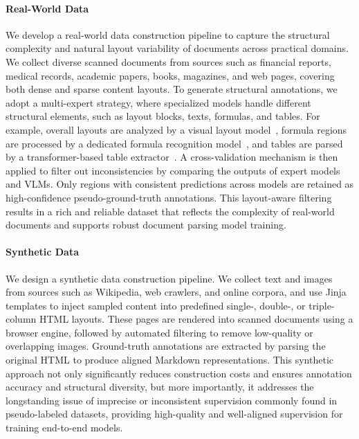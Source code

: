 \paragraph{Real-World Data} We develop a real-world data construction pipeline to capture the structural complexity and natural layout variability of documents across practical domains. We collect diverse scanned documents from sources such as financial reports, medical records, academic papers, books, magazines, and web pages, covering both dense and sparse content layouts. To generate structural annotations, we adopt a multi-expert strategy, where specialized models handle different structural elements, such as layout blocks, texts, formulas, and tables. For example, overall layouts are analyzed by a visual layout model~\citep{huang2022layoutlmv3pretrainingdocumentai}, formula regions are processed by a dedicated formula recognition model~\citep{wang2024unimernetuniversalnetworkrealworld}, and tables are parsed by a transformer-based table extractor~\citep{Nougat}. A cross-validation mechanism is then applied to filter out inconsistencies by comparing the outputs of expert models and VLMs. Only regions with consistent predictions across models are retained as high-confidence pseudo-ground-truth annotations. This layout-aware filtering results in a rich and reliable dataset that reflects the complexity of real-world documents and supports robust document parsing model training.







\paragraph{Synthetic Data} We design a synthetic data construction pipeline. We collect text and images from sources such as Wikipedia, web crawlers, and online corpora, and use Jinja~\citep{nipkow2003jinja} templates to inject sampled content into predefined single-, double-, or triple-column HTML layouts. These pages are rendered into scanned documents using a browser engine, followed by automated filtering to remove low-quality or overlapping images. Ground-truth annotations are extracted by parsing the original HTML to produce aligned Markdown representations.  This synthetic approach not only significantly reduces construction costs and ensures annotation accuracy and structural diversity, but more importantly, it addresses the longstanding issue of imprecise or inconsistent supervision commonly found in pseudo-labeled datasets, providing high-quality and well-aligned supervision for training end-to-end models.



